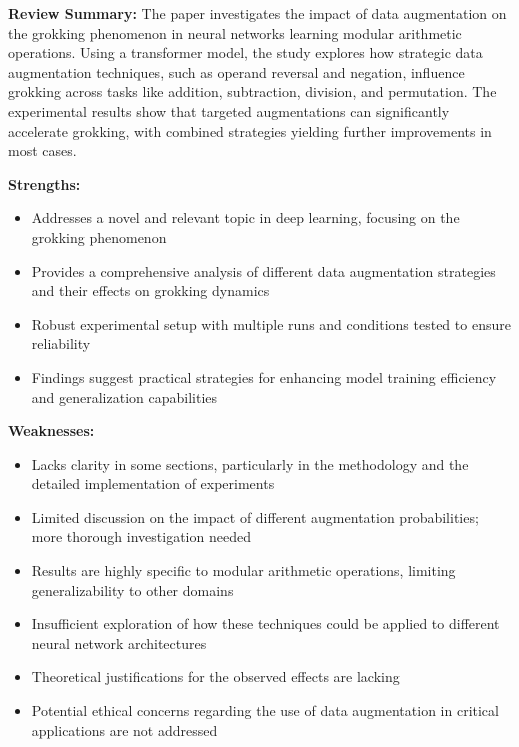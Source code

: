 \begin{tcolorbox}[colback=blue!5!white, colframe=blue!75!black, title=Review Summary, ] 
\textbf{Review Summary:} The paper investigates the impact of data augmentation on the grokking phenomenon in neural networks learning modular arithmetic operations. Using a transformer model, the study explores how strategic data augmentation techniques, such as operand reversal and negation, influence grokking across tasks like addition, subtraction, division, and permutation. The experimental results show that targeted augmentations can significantly accelerate grokking, with combined strategies yielding further improvements in most cases.

\textbf{Strengths:}
\begin{itemize}
    \item Addresses a novel and relevant topic in deep learning, focusing on the grokking phenomenon
    \item Provides a comprehensive analysis of different data augmentation strategies and their effects on grokking dynamics
    \item Robust experimental setup with multiple runs and conditions tested to ensure reliability
    \item Findings suggest practical strategies for enhancing model training efficiency and generalization capabilities
\end{itemize}

\textbf{Weaknesses:}
\begin{itemize}
    \item Lacks clarity in some sections, particularly in the methodology and the detailed implementation of experiments
    \item Limited discussion on the impact of different augmentation probabilities; more thorough investigation needed
    \item Results are highly specific to modular arithmetic operations, limiting generalizability to other domains
    \item Insufficient exploration of how these techniques could be applied to different neural network architectures
    \item Theoretical justifications for the observed effects are lacking
    \item Potential ethical concerns regarding the use of data augmentation in critical applications are not addressed
\end{itemize}
\end{tcolorbox}

